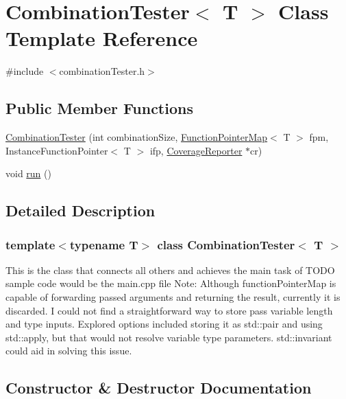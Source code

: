 \hypertarget{classCombinationTester}{}\section{Combination\+Tester$<$ T $>$ Class Template Reference}
\label{classCombinationTester}


{\ttfamily \#include $<$combination\+Tester.\+h$>$}

\subsection*{Public Member Functions}
\begin{DoxyCompactItemize}
\item 
\hyperlink{classCombinationTester_a9eef45cd51683748083a1148bff36f74}{Combination\+Tester} (int combination\+Size, \hyperlink{classFunctionPointerMap}{Function\+Pointer\+Map}$<$ T $>$ fpm, Instance\+Function\+Pointer$<$ T $>$ ifp, \hyperlink{classCoverageReporter}{Coverage\+Reporter} $\ast$cr)
\item 
void \hyperlink{classCombinationTester_ada3b5998973cb34e6343a971390b3a12}{run} ()
\end{DoxyCompactItemize}


\subsection{Detailed Description}
\subsubsection*{template$<$typename T$>$\newline
class Combination\+Tester$<$ T $>$}

This is the class that connects all others and achieves the main task of T\+O\+DO sample code would be the main.\+cpp file Note\+: Although function\+Pointer\+Map is capable of forwarding passed arguments and returning the result, currently it is discarded. I could not find a straightforward way to store pass variable length and type inputs. Explored options included storing it as std\+::pair and using std\+::apply, but that would not resolve variable type parameters. std\+::invariant could aid in solving this issue. 

\subsection{Constructor \& Destructor Documentation}
\mbox{\label{classCombinationTester_a9eef45cd51683748083a1148bff36f74}} 
